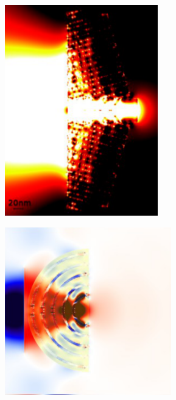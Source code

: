 			\begin{figure}
				\includegraphics[angle=90,width=\textwidth]{images/multilayer/konc_ene_mgr.png}
			\end{figure}


			\begin{figure}
				\includegraphics[width=\textwidth]{images/multilayer/konc_polk_poynt.png}\\
			\end{figure}


